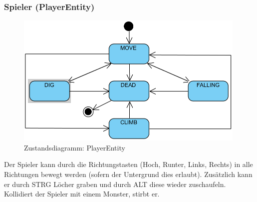 \documentclass[12pt]{article}
\begin{document}
\subsubsection{Spieler (PlayerEntity)}
	\begin{figure}[ht]
		\centering
		\includegraphics[height=180pt]{images/sd_player}
		\caption{Zustandsdiagramm: PlayerEntity}
		\label{fig:impl:player_entity}
	\end{figure}
	Der Spieler kann durch die Richtungstasten (Hoch, Runter, Links, Rechts) in alle Richtungen bewegt werden (sofern der Untergrund dies erlaubt). Zusätzlich kann er durch STRG Löcher graben und durch ALT diese wieder zuschaufeln. Kollidiert der Spieler mit einem Monster, stirbt er.
\end{document}
